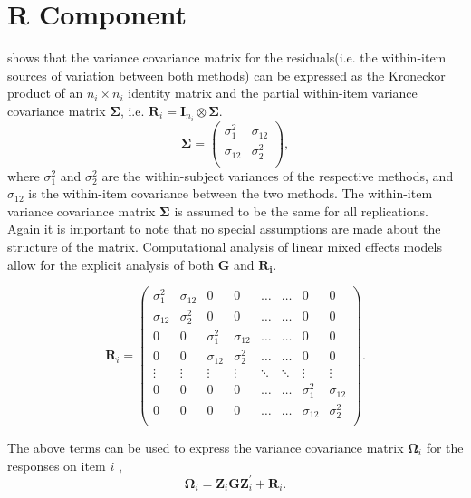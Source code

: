 \documentclass[12pt, a4paper]{report}
\theoremstyle{plain}
\theoremstyle{definition}
\theoremstyle{remark}
\begin{document}
\section{R Component}
\citet{hamlett} shows that the variance covariance matrix for the residuals(i.e. the within-item sources of variation between both methods) can be expressed as the Kroneckor product of an $n_i \times n_i$ identity matrix and the partial within-item variance covariance matrix $\boldsymbol{\Sigma}$, i.e. $\boldsymbol{R}_{i} = \boldsymbol{I}_{n_{i}} \otimes \boldsymbol{\Sigma}$.
\[
\boldsymbol{\Sigma} = \left( \begin{array}{cc}
\sigma^2_{1} & \sigma_{12} \\
\sigma_{12} & \sigma^2_{2} \\
\end{array}\right),
\]
where $\sigma^2_{1}$ and $\sigma^2_{2}$ are the within-subject variances of the respective methods, and $\sigma_{12}$ is the within-item covariance between the two methods. The within-item variance covariance matrix $\boldsymbol{\Sigma}$ is assumed to be the same for all replications.  Again it is important to note that no special assumptions are made about the structure of the matrix. Computational analysis of linear mixed effects models allow for the explicit analysis of both $\boldsymbol{G}$ and $\boldsymbol{R_i}$.

\[ \boldsymbol{R}_i =\left(
\begin{array}{cccccccc}
\sigma^2_1  & \sigma_{12} & 0 & 0 & \ldots & \ldots & 0 & 0 \\
\sigma_{12} & \sigma^2_2  & 0 & 0  & \ldots & \ldots & 0 & 0\\

0 & 0 &\sigma^2_1  & \sigma_{12} & \ldots & \ldots& 0 &  0 \\
0 & 0 &\sigma_{12} & \sigma^2_2  & \ldots & \ldots & 0 & 0 \\
\vdots & \vdots &\vdots & \vdots & \ddots & \ddots& \vdots & \vdots \\

0 & 0 &0 & 0 & \ldots & \ldots&\sigma^2_1  & \sigma_{12} \\
0 & 0 &0 & 0 & \ldots & \ldots &\sigma_{12} & \sigma^2_2 \\
\end{array}
\right). \]

The above terms can be used to express the  variance covariance matrix $\boldsymbol{\Omega}_i$ for the responses on item $i$ ,
\[
\boldsymbol{\Omega}_i = \boldsymbol{Z}_i \boldsymbol{G} \boldsymbol{Z}_i^{\prime} + \boldsymbol{R}_i.
\]
\end{document}
